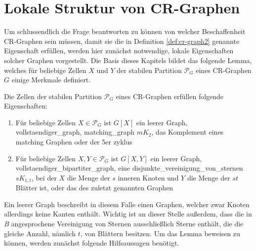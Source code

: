 \section{Lokale Struktur von CR-Graphen}
\label{sec/struktur_lokal}


Um schlussendlich die Frage beantworten zu können von welcher Beschaffenheit CR-Graphen sein müssen, damit sie die in Definition \ref{def:cr-graph2} genannte Eigenschaft erfüllen, werden hier zunächst notwendige, lokale Eigenschaften solcher Graphen vorgestellt.
Die Basis dieses Kapitels bildet das folgende Lemma, welches für beliebige Zellen $X$ und $Y$ der stabilen Partition $\mathcal{P}_G$ eines CR-Graphen $G$ einige Merkmale definiert.

\begin{Lemma}
	Die Zellen der stabilen Partition $\mathcal{P}_G$ eines CR-Graphen erfüllen folgende Eigenschaften:
	
	\begin{enumerate}[label=(\Alph*)]
		\item Für beliebige Zellen $X\in \mathcal{P}_G$ ist $G[X]$ ein leerer Graph, \gls{vollstaendiger_graph}, \gls{matching_graph} $mK_2$, das Komplement eines matching Graphen oder der 5er \gls{zyklus}
		\item Für beliebige Zellen $X,Y\in \mathcal{P}_G$ ist $G[X,Y]$ ein leerer Graph, \gls{vollstaendiger_bipartiter_graph}, eine \gls{disjunkte_vereinigung_von_sternen} $sK_{1,t}$, bei der $X$ die Menge der $s$ inneren Knoten und $Y$ die Menge der $st$ Blätter ist, oder das  des zuletzt genannten Graphen
	\end{enumerate}
	\label{lemma:lokal}
\end{Lemma}

Ein leerer Graph beschreibt in diesem Falle einen Graphen, welcher zwar Knoten allerdings keine Kanten enthält.
Wichtig ist an dieser Stelle außerdem, dass die in \emph{B} angesprochene Vereinigung von Sternen ausschließlich Sterne enthält, die die gleiche Anzahl, nämlich $t$, von Blättern besitzen.
Um das Lemma beweisen zu können, werden zunächst folgende Hilfsaussagen benötigt.

